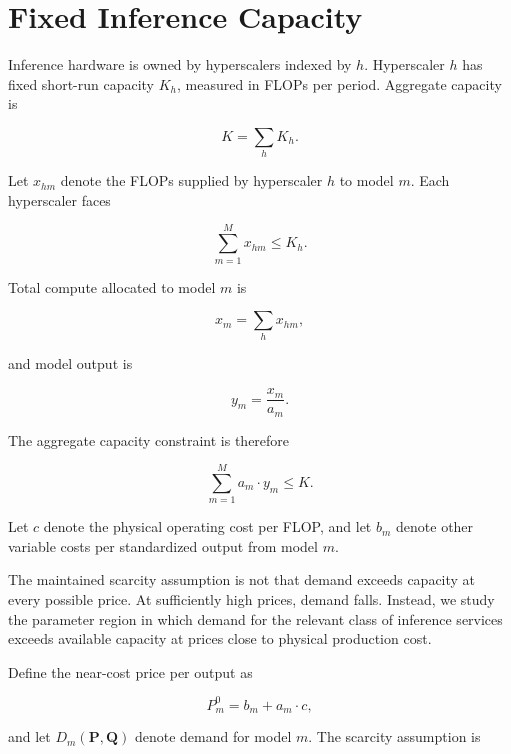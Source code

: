 \documentclass[11pt]{article}
\begin{document}
\section{Fixed Inference Capacity}
\label{sec:fixed-capacity}

Inference hardware is owned by hyperscalers indexed by $h$. Hyperscaler $h$ has fixed short-run capacity $K_h$, measured in FLOPs per period. Aggregate capacity is

\begin{equation}K=\sum_h K_h.\end{equation}

Let $x_{hm}$ denote the FLOPs supplied by hyperscaler $h$ to model $m$. Each hyperscaler faces

\begin{equation}\sum_{m=1}^{M}x_{hm}\leq K_h.\end{equation}

Total compute allocated to model $m$ is

\begin{equation}x_m=\sum_h x_{hm},\end{equation}

and model output is

\begin{equation}y_m=\frac{x_m}{a_m}.\end{equation}

The aggregate capacity constraint is therefore

\begin{equation}\sum_{m=1}^{M}a_m\cdot y_m\leq K.\end{equation}

Let $c$ denote the physical operating cost per FLOP, and let $b_m$ denote other variable costs per standardized output from model $m$.

The maintained scarcity assumption is not that demand exceeds capacity at every possible price. At sufficiently high prices, demand falls. Instead, we study the parameter region in which demand for the relevant class of inference services exceeds available capacity at prices close to physical production cost.

Define the near-cost price per output as

\begin{equation}P_m^0=b_m+a_m\cdot c,\end{equation}

and let $D_m(\mathbf P,\mathbf Q)$ denote demand for model $m$. The scarcity assumption is
\end{document}
